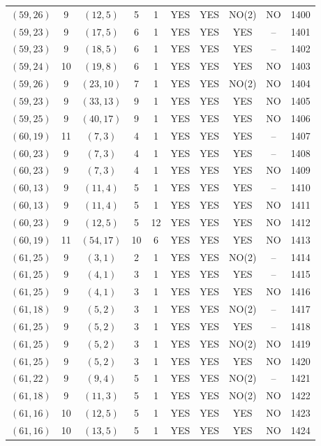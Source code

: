 \begin{longtable}{|c|c|c|c|c|c|c|c|c|c|}
$(59, 26)$ & 9 & $(12, 5)$ & 5 & 1 & YES & YES & NO(2) & NO & 1400\\
$(59, 23)$ & 9 & $(17, 5)$ & 6 & 1 & YES & YES & YES & -- & 1401\\
$(59, 23)$ & 9 & $(18, 5)$ & 6 & 1 & YES & YES & YES & -- & 1402\\
$(59, 24)$ & 10 & $(19, 8)$ & 6 & 1 & YES & YES & YES & NO & 1403\\
$(59, 26)$ & 9 & $(23, 10)$ & 7 & 1 & YES & YES & NO(2) & NO & 1404\\
$(59, 23)$ & 9 & $(33, 13)$ & 9 & 1 & YES & YES & YES & NO & 1405\\
$(59, 25)$ & 9 & $(40, 17)$ & 9 & 1 & YES & YES & YES & NO & 1406\\
$(60, 19)$ & 11 & $(7, 3)$ & 4 & 1 & YES & YES & YES & -- & 1407\\
$(60, 23)$ & 9 & $(7, 3)$ & 4 & 1 & YES & YES & YES & -- & 1408\\
$(60, 23)$ & 9 & $(7, 3)$ & 4 & 1 & YES & YES & YES & NO & 1409\\
$(60, 13)$ & 9 & $(11, 4)$ & 5 & 1 & YES & YES & YES & -- & 1410\\
$(60, 13)$ & 9 & $(11, 4)$ & 5 & 1 & YES & YES & YES & NO & 1411\\
$(60, 23)$ & 9 & $(12, 5)$ & 5 & 12 & YES & YES & YES & NO & 1412\\
$(60, 19)$ & 11 & $(54, 17)$ & 10 & 6 & YES & YES & YES & NO & 1413\\
$(61, 25)$ & 9 & $(3, 1)$ & 2 & 1 & YES & YES & NO(2) & -- & 1414\\
$(61, 25)$ & 9 & $(4, 1)$ & 3 & 1 & YES & YES & YES & -- & 1415\\
$(61, 25)$ & 9 & $(4, 1)$ & 3 & 1 & YES & YES & YES & NO & 1416\\
$(61, 18)$ & 9 & $(5, 2)$ & 3 & 1 & YES & YES & NO(2) & -- & 1417\\
$(61, 25)$ & 9 & $(5, 2)$ & 3 & 1 & YES & YES & YES & -- & 1418\\
$(61, 25)$ & 9 & $(5, 2)$ & 3 & 1 & YES & YES & NO(2) & NO & 1419\\
$(61, 25)$ & 9 & $(5, 2)$ & 3 & 1 & YES & YES & YES & NO & 1420\\
$(61, 22)$ & 9 & $(9, 4)$ & 5 & 1 & YES & YES & NO(2) & -- & 1421\\
$(61, 18)$ & 9 & $(11, 3)$ & 5 & 1 & YES & YES & NO(2) & NO & 1422\\
$(61, 16)$ & 10 & $(12, 5)$ & 5 & 1 & YES & YES & YES & NO & 1423\\
$(61, 16)$ & 10 & $(13, 5)$ & 5 & 1 & YES & YES & YES & NO & 1424\\

\end{longtable}
